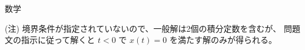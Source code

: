 \documentclass[fleqn]{jbook}
\begin{document}
\begin{answer}{数学}{}
\begin{enumerate}
\begin{enumerate}
\begin{enumerate}
(注) 境界条件が指定されていないので、一般解は2個の積分定数を含むが、
問題文の指示に従って解くと $t<0$ で $x(t)=0$ を満たす解のみが得られる。
\end{enumerate}
\end{enumerate}


\end{enumerate}
\end{answer}
\end{document}
